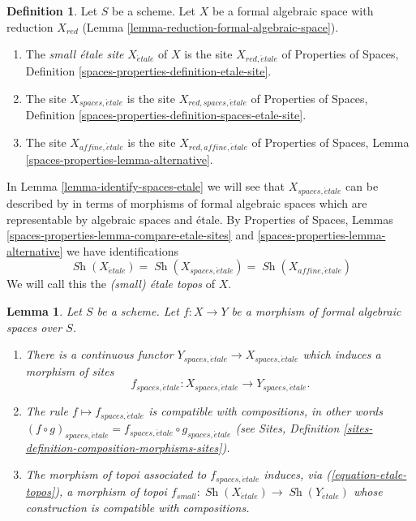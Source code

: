 \documentclass{stacks-project}
\theoremstyle{plain}
\newtheorem{lemma}[subsection]{Lemma}
\theoremstyle{definition}
\newtheorem{definition}[subsection]{Definition}
\theoremstyle{remark}
\numberwithin{equation}{subsection}
\def\Sh{\mathop{\mathit{Sh}}\nolimits}
\def\etale{{\acute{e}tale}}
\begin{document}
\begin{definition}
\label{definition-etale-sites}
Let $S$ be a scheme. Let $X$ be a formal algebraic space with
reduction $X_{red}$ (Lemma \ref{lemma-reduction-formal-algebraic-space}).
\begin{enumerate}
\item The {\it small \'etale site} $X_\etale$ of $X$ is
the site $X_{red, \etale}$ of Properties of Spaces, Definition
\ref{spaces-properties-definition-etale-site}.
\item The site $X_{spaces, \etale}$ is the site
$X_{red, spaces, \etale}$ of Properties of Spaces, Definition
\ref{spaces-properties-definition-spaces-etale-site}.
\item The site $X_{affine, \etale}$ is the site
$X_{red, affine, \etale}$ of Properties of Spaces, Lemma
\ref{spaces-properties-lemma-alternative}.
\end{enumerate}
\end{definition}

\noindent
In Lemma \ref{lemma-identify-spaces-etale} we will see that
$X_{spaces, \etale}$ can be described by in terms of
morphisms of formal algebraic spaces which are representable
by algebraic spaces and \'etale.
By Properties of Spaces, Lemmas
\ref{spaces-properties-lemma-compare-etale-sites} and
\ref{spaces-properties-lemma-alternative}
we have identifications
\begin{equation}
\label{equation-etale-topos}
\Sh(X_\etale) = \Sh(X_{spaces, \etale}) = \Sh(X_{affine, \etale})
\end{equation}
We will call this the {\it (small) \'etale topos} of $X$.

\begin{lemma}
\label{lemma-functoriality-etale-site}
Let $S$ be a scheme.
Let $f : X \to Y$ be a morphism of formal algebraic spaces over $S$.
\begin{enumerate}
\item There is a continuous functor
$Y_{spaces, \etale} \to X_{spaces, \etale}$
which induces a morphism of sites
$$
f_{spaces, \etale} : X_{spaces, \etale} \to Y_{spaces, \etale}.
$$
\item The rule $f \mapsto f_{spaces, \etale}$ is compatible with
compositions, in other words $(f \circ g)_{spaces, \etale}
= f_{spaces, \etale} \circ g_{spaces, \etale}$ (see
Sites, Definition \ref{sites-definition-composition-morphisms-sites}).
\item The morphism of topoi associated to $f_{spaces, \etale}$
induces, via (\ref{equation-etale-topos}), a morphism of topoi
$f_{small} : \Sh(X_\etale) \to \Sh(Y_\etale)$
whose construction is compatible with compositions.
\end{enumerate}
\end{lemma}
\end{document}
